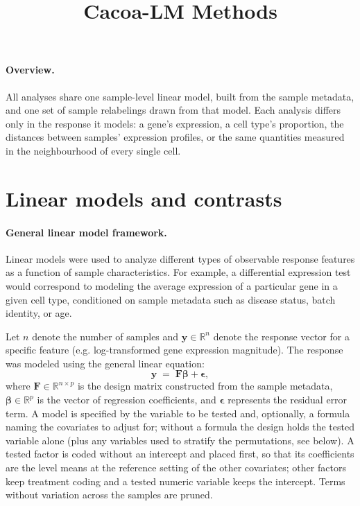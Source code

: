 \documentclass{article}
\title{Cacoa-LM Methods}
\author{ }
\date{ }
\begin{document}
\maketitle

\paragraph{Overview.}
All analyses share one sample-level linear model, built from the sample metadata, and one set of sample relabelings drawn from that model. Each analysis differs only in the response it models: a gene's expression, a cell type's proportion, the distances between samples' expression profiles, or the same quantities measured in the neighbourhood of every single cell.

\section{Linear models and contrasts}

\paragraph{General linear model framework.}
Linear models were used to analyze different types of observable response features as a function of sample characteristics. For example, a differential expression test would correspond to modeling the average expression of a particular gene in a given cell type, conditioned on sample metadata such as disease status, batch identity, or age. 

Let $n$ denote the number of samples and $\mathbf{y} \in \mathbb{R}^n$ denote the response vector for a specific feature (e.g. log-transformed gene expression magnitude). The response was modeled using the general linear equation:
\begin{equation}
\mathbf{y} \;=\; \mathbf{F} \boldsymbol{\beta} + \boldsymbol{\epsilon},
\end{equation}
where $\mathbf{F} \in \mathbb{R}^{n \times p}$ is the design matrix constructed from the sample metadata, $\boldsymbol{\beta} \in \mathbb{R}^p$ is the vector of regression coefficients, and $\boldsymbol{\epsilon}$ represents the residual error term. A model is specified by the variable to be tested and, optionally, a formula naming the covariates to adjust for; without a formula the design holds the tested variable alone (plus any variables used to stratify the permutations, see below). A tested factor is coded without an intercept and placed first, so that its coefficients are the level means at the reference setting of the other covariates; other factors keep treatment coding and a tested numeric variable keeps the intercept. Terms without variation across the samples are pruned.
\end{document}
